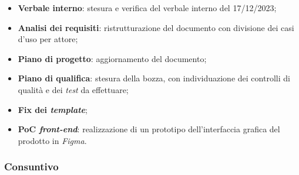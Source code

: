 \begin{itemize}
	\item \textbf{Verbale interno}: stesura e verifica del verbale interno del
	      17/12/2023;

	\item \textbf{Analisi dei requisiti}: ristrutturazione del documento con
	      divisione dei casi d'uso per attore\g;

	\item \textbf{Piano di progetto}: aggiornamento del documento;

	\item \textbf{Piano di qualifica}: stesura della bozza, con individuazione
	      dei controlli di qualità e dei \textit{test} da effettuare;

	\item \textbf{Fix dei \textit{template}};

	\item \textbf{PoC \textit{front-end}}: realizzazione di un prototipo
	      dell'interfaccia grafica del prodotto in \textit{Figma}.
\end{itemize}

\subsubsection{Consuntivo}

